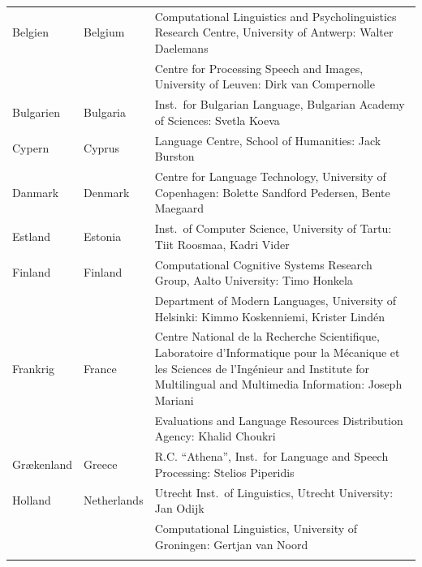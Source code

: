 \small
\begin{longtable}{llp{113mm}}
  Belgien & \textcolor{grey1}{Belgium} & Computational Linguistics and Psycholinguistics Research Centre, University of Antwerp: Walter Daelemans\\ \addlinespace
  & & Centre for Processing Speech and Images, University of Leuven: Dirk van Compernolle \\ \addlinespace 
  
Bulgarien & \textcolor{grey1}{Bulgaria} & Inst.~for Bulgarian Language, Bulgarian Academy of Sciences: Svetla Koeva \\ \addlinespace

Cypern & \textcolor{grey1}{Cyprus} & Language Centre, School of Humanities: Jack Burston \\ \addlinespace

Danmark &  \textcolor{grey1}{Denmark} & Centre for Language Technology, University of Copenhagen: \newline Bolette Sandford Pedersen, Bente Maegaard\\ \addlinespace

  Estland & \textcolor{grey1}{Estonia} & Inst.~of Computer Science, University of Tartu: Tiit Roosmaa, Kadri Vider\\ \addlinespace
  
  Finland & \textcolor{grey1}{Finland} & Computational Cognitive Systems Research Group, Aalto University: Timo Honkela\\ \addlinespace
  & & Department of Modern Languages, University of Helsinki: \newline Kimmo Koskenniemi, Krister Lindén \\ \addlinespace

  Frankrig & \textcolor{grey1}{France} & Centre National de la Recherche Scientifique, Laboratoire d'Informatique pour la Mécanique et les Sciences de l'Ingénieur and Institute for Multilingual and Multimedia Information: Joseph Mariani \\ \addlinespace
  & & Evaluations and Language Resources Distribution Agency: Khalid Choukri\\ \addlinespace
  
  Gr\ae kenland & \textcolor{grey1}{Greece} & R.C. “Athena”, Inst.~for Language and Speech Processing: Stelios Piperidis\\ \addlinespace
  
 Holland & \textcolor{grey1}{Netherlands} & Utrecht Inst.~of Linguistics, Utrecht University: Jan Odijk\\ \addlinespace 
  & & Computational Linguistics, University of Groningen: Gertjan van Noord\\ \addlinespace
  

\end{longtable}
